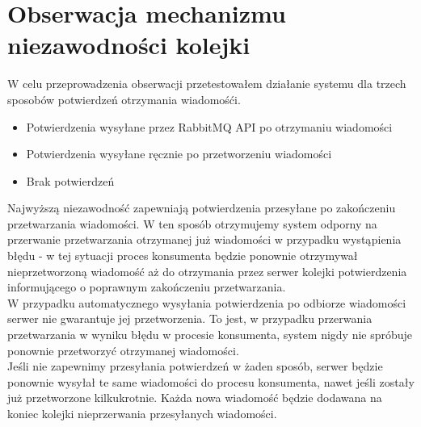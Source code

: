 \documentclass{article}
\begin{document}
    \section{Obserwacja mechanizmu niezawodności kolejki}
        W celu przeprowadzenia obserwacji przetestowałem działanie systemu dla trzech sposobów potwierdzeń otrzymania wiadomośći. 
        \begin{itemize}
            \item Potwierdzenia wysyłane przez RabbitMQ API po otrzymaniu wiadomości
            \item Potwierdzenia wysyłane ręcznie po przetworzeniu wiadomości 
            \item Brak potwierdzeń
        \end{itemize}
        Najwyższą niezawodność zapewniają potwierdzenia przesyłane po zakończeniu przetwarzania wiadomości. W ten sposób otrzymujemy system odporny na przerwanie przetwarzania otrzymanej już wiadomości w przypadku wystąpienia błędu - w tej sytuacji proces konsumenta będzie ponownie otrzymywał nieprzetworzoną wiadomość aż do otrzymania przez serwer kolejki potwierdzenia informującego o poprawnym zakończeniu przetwarzania. \\
        W przypadku automatycznego wysyłania potwierdzenia po odbiorze wiadomości serwer nie gwarantuje jej przetworzenia. To jest, w przypadku przerwania przetwarzania w wyniku błędu w procesie konsumenta, system nigdy nie spróbuje ponownie przetworzyć otrzymanej wiadomości. \\
        Jeśli nie zapewnimy przesyłania potwierdzeń w żaden sposób, serwer będzie ponownie wysyłał te same wiadomości do procesu konsumenta, nawet jeśli zostały już przetworzone kilkukrotnie. Każda nowa wiadomość będzie dodawana na koniec kolejki nieprzerwania przesyłanych wiadomości. 
        
\end{document}
